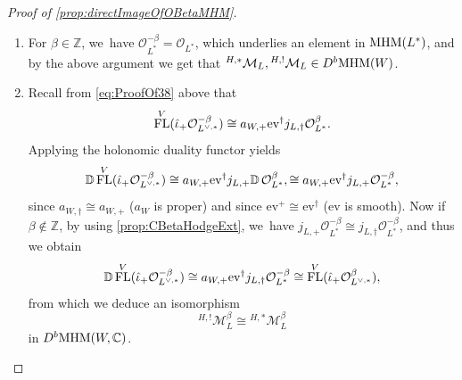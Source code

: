 \documentclass[JEP,XML,SOM,Unicode,published]{cedram}
\let\mathds\mathbb
\newcommand{\ev}{\mathrm{ev}}
\newcommand{\dC}{{\mathds C}}\let\C\dC
\newcommand{\dZ}{{\mathds Z}}\let\mbz\dZ\let\Z\dZ
\newcommand{\bD}{{\mathbb D}}\let\mbd\bD
\newcommand{\cD}{\mathscr{D}}
\newcommand{\cM}{\mathcal{M}}
\newcommand{\cO}{\mathcal{O}}\let\O\cO
\DeclareMathOperator{\FL}{\textup{FL}}
\newcommand{\MHM}{\textup{MHM}}
\newcommand{\Mh}{{^{H,*}}\cM_L^\beta}
\newcommand{\MhD}{{^{H,!}}\cM_L^{-\beta}}
\begin{document}
\begin{proof}[Proof of \cref{prop:directImageOfOBetaMHM}]
\begin{enumerate}
On the spaces $V$ and $L^{\vee,*}$, we~consider the isomorphisms $c_V$ and $c_{L^{\vee,*}}$ given by multiplication by $-1$ (in all variables for $c_V$ and fiberwise for~$c_{L^{\vee,*}}$). Then since the Fourier transformation $\FL^V$ and the holonomic duality commute up to the action of~$c_V$ (\ie since
$\bD\, \circ \FL^V\cong \FL^V\circ\bD\circ c_V^+$), we~obtain the following isomorphisms in $D^b(\cD_W)$ for the complex of $\cD_W$\nobreakdash-mod\-ules underlying $\MhD$:
\begin{align*}
\bD \FL^V(\hat{\iota}_+ \cO^\beta_{L^{\vee,*}}) &\simeq \FL^V \bD \, c^+_V (\hat{\iota}_+ \cO^\beta_{L^{\vee,*}}) \\
&\simeq \FL^V \bD (\hat{\iota}_+ c^+_{L^{\vee,*}} \cO^\beta_{L^{\vee,*}}) &
\begin{array}{l}
\textup{since } c_V\circ\hat{\iota}=\hat{\iota}\circ c_{L^{\vee,*}}\\ \textup{by definition of }\hat{\iota}
\end{array}
\\
&\simeq \FL^V \bD (\hat{\iota}_+ \cO^\beta_{L^{\vee,*}})
&{\exists\textup{ isom. } c^+_{L^{\vee,*}}\cO^\beta_{L^{\vee,*}}\cong \cO^\beta_{L^{\vee,*}}} \\
& \simeq \FL^V (\hat{\iota}_\dag \bD\, \cO^\beta_{L^{\vee,*}}) &
{\bD\, \hat{\iota}_+ \cong \hat{\iota}_\dag\,\bD}\\
& \simeq \FL^V (\hat{\iota}_\dag \cO^{-\beta}_{L^{\vee,*}})
& {\bD\, \cO^\beta_{L^{\vee,*}}\cong \cO^{-\beta}_{L^{\vee,*}} \textup{ by \cref{lem:OLbetaDual}}}.
\end{align*}
This shows that $\FL^V (\hat{\iota}_\dag \cO^{-\beta}_{L^{\vee,*}})$ is the complex of $\cD_W$\nobreakdash-mod\-ules underlying the object $\MhD$, as claimed.

The second statement follows directly from the fact that $\cO_{L^*}^\beta\cong\cO_{L^*}^{\beta'}$ for $\beta-\beta'\in \Z$.
\item
For $\beta\in \dZ$, we~have $\cO_{L^*}^{-\beta}=\cO_{L^*}$, which underlies an element in $\MHM(L^*)$, and by the above argument we get that
${^{H,*}}\cM_L, {^{H,!}}\cM_L \in D^b\MHM(W)$.
\item
Recall from \eqref{eq:ProofOf38} above that
\[
\FL^V(\hat{\iota}_+\cO_{L^{\vee,*}}^{-\beta}) \cong a_{W,+} \ev^\dag j_{L,\dag} \cO_{L^*}^\beta.
\]
Applying the holonomic duality functor yields
\[
\bD \FL^V(\hat{\iota}_+\cO_{L^{\vee,*}}^{-\beta})
\cong
a_{W,+} \ev^\dag j_{L,+} \bD \, \cO_{L^*}^\beta,
\cong
a_{W,+} \ev^\dag j_{L,+} \cO_{L^*}^{-\beta},
\]
since $a_{W,\dag}\cong a_{W,+}$ ($a_W$ is proper) and since $\ev^+\cong \ev^\dag$ ($\ev$ is smooth). Now if $\beta\notin\dZ$, by using \cref{prop:CBetaHodgeExt}, we~have $j_{L,+}\cO_{L^*}^{-\beta} \cong j_{L,\dag}\cO_{L^*}^{-\beta}$, and thus we obtain
\[
\bD \FL^V(\hat{\iota}_+\cO_{L^{\vee,*}}^{-\beta})
\cong
a_{W,+} \ev^\dag j_{L,\dag} \cO_{L^*}^{-\beta}
\cong
\FL^V(\hat{\iota}_+\cO_{L^{\vee,*}}^{\beta}),
\]
from which we deduce an isomorphism
\[
{^{H,!}}\cM_L^{\beta} \cong \Mh
\]
in $D^b\MHM(W,\dC)$.


\end{enumerate}
\end{proof}
\end{document}
